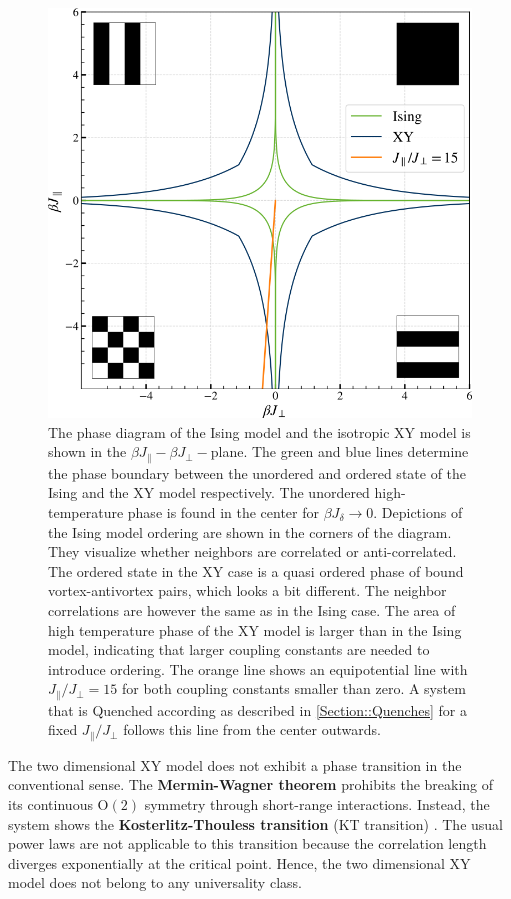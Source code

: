 	\begin{figure}
		\centering
		\includegraphics[width=0.8\linewidth]{graphics/Phase-diagram-Ising-XY-clean.png}
		\caption{The phase diagram of the Ising model and the isotropic XY model is shown in the $\beta J_\parallel-\beta J_\perp-$plane. The green and blue lines determine the phase boundary between the unordered and ordered state of the Ising and the XY model respectively. The unordered high-temperature phase is found in the center for $\beta J_\delta \rightarrow 0$. Depictions of the Ising model ordering are shown in the corners of the diagram. They visualize whether neighbors are correlated or anti-correlated. The ordered state in the XY case is a quasi ordered phase of bound vortex-antivortex pairs, which looks a bit different. The neighbor correlations are however the same as in the Ising case. The area of high temperature phase of the XY model is larger than in the Ising model, indicating that larger coupling constants are needed to introduce ordering. The orange line shows an equipotential line with $J_\parallel /	J_\perp =	15$ for both coupling constants smaller than zero. A system that is Quenched according as described in \autoref{Section::Quenches} for a fixed $J_\parallel /	J_\perp$ follows this line from the center outwards.}
		\label{Fig::XY-Ising-PD}
	\end{figure}
	
	The two dimensional XY model does not exhibit a phase transition in the conventional sense. The \textbf{Mermin-Wagner theorem} \cite{mermin1966absence} prohibits the breaking of its continuous $\text{O}(2)$ symmetry through short-range interactions. Instead, the system shows the \textbf{Kosterlitz-Thouless transition} (KT transition) \cite{JMKosterlitz_1973, berezinskii1971destruction}. The usual power laws are not applicable to this transition because the correlation length diverges exponentially at the critical point. Hence, the two dimensional XY model does not belong to any universality class. \\
	
